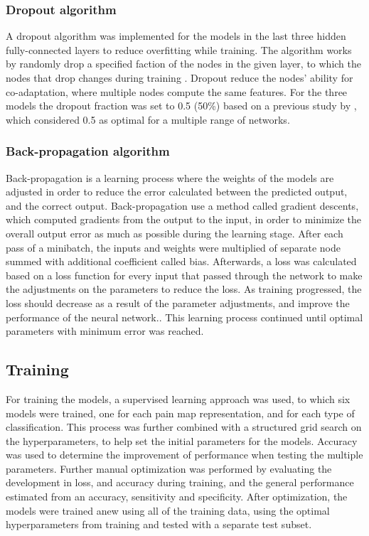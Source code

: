 \subsubsection*{\textbf{Dropout algorithm}}
A dropout algorithm was implemented for the models in the last three hidden fully-connected layers to reduce overfitting while training. The algorithm works by randomly drop a specified faction of the nodes in the given layer, to which the nodes that drop changes during training \citep{Srivastava2014}.  Dropout reduce the nodes’ ability for co-adaptation, where multiple nodes compute the same features. For the three models the dropout fraction was set to 0.5 (50\%) based on a previous study by \citeauthor{Srivastava2014} \citep{Srivastava2014}, which considered 0.5 as optimal for a multiple range of networks.   

\subsubsection*{\textbf{Back-propagation algorithm}}
Back-propagation is a learning process where the weights of the models are adjusted in order to reduce the error calculated between the predicted output, and the correct output. \citep{Duda2000} Back-propagation use a method called gradient descents, which computed gradients from the output to the input, in order to minimize the overall output error as much as possible during the learning stage. 
After each pass of a minibatch, the inputs and weights were multiplied of separate node summed with additional coefficient called bias.\citep{Hameed2016,LeCun1998}
Afterwards, a loss was calculated based on a loss function for every input that passed through the network to make the adjustments on the parameters to reduce the loss. As training progressed, the loss should decrease as a result of the parameter adjustments, and improve the performance of the neural network.\citep{LeCun2015, Goodfellow2016, Duda2000}. This learning process continued until optimal parameters with minimum error was reached.\citep{Hameed2016}


\subsection*{\textbf{Training}}
For training the models, a supervised learning approach was used, to which six models were trained, one for each pain map representation, and for each type of classification. 
This process was further combined with a structured grid search on the hyperparameters, to help set the initial parameters for the models. Accuracy was used to determine the improvement of performance when testing the multiple parameters.
Further manual optimization was performed by evaluating the development in loss, and accuracy during training, and the general performance estimated from an accuracy, sensitivity and specificity. After optimization, the models were trained anew using all of the training data, using the optimal hyperparameters from training and tested with a separate test subset.
 

